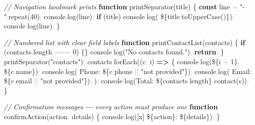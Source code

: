 \documentclass[
  justified,
  openright,
]{tufte-book}
\newcommand{\KeywordTok}[1]{\textcolor{CodeKeyword}{\textbf{#1}}}  %
\newcommand{\StringTok}[1]{\textcolor{CodeString}{#1}}              %
\newcommand{\CommentTok}[1]{\textcolor{CodeComment}{\textit{#1}}}  %
\newcommand{\CodeNumTok}[1]{\textcolor{CodeNumber}{#1}}             %
\newcommand{\CodeFuncTok}[1]{\textcolor{CodeKeyword}{#1}}           %
\newcommand{\CodeTypeTok}[1]{\textcolor{CodeType}{#1}}              %
\newcommand{\OperatorTok}[1]{\textcolor{DarkGray}{#1}}              %
\newenvironment{Shaded}{%
  \begin{mdframed}[style=TufteCode]%
}{%
  \end{mdframed}%
}
\begin{document}
\begin{Shaded}
\begin{Highlighting}[]
\CommentTok{// Navigation landmark prints}
\KeywordTok{function} \CodeFuncTok{printSeparator}(title) \{
  \KeywordTok{const} line \OperatorTok{=} \StringTok{"{-}"}\OperatorTok{.}\CodeFuncTok{repeat}(\CodeNumTok{40})\OperatorTok{;}
  console\OperatorTok{.}\CodeFuncTok{log}(line)\OperatorTok{;}
  \KeywordTok{if} (title) console\OperatorTok{.}\CodeFuncTok{log}(\StringTok{\textasciigrave{}  }\StringTok{\$\{}title\OperatorTok{.}\CodeFuncTok{toUpperCase}()\StringTok{\}}\StringTok{\textasciigrave{}})\OperatorTok{;}
  console\OperatorTok{.}\CodeFuncTok{log}(line)\OperatorTok{;}
\}
 
\CommentTok{// Numbered list with clear field labels}
\KeywordTok{function} \CodeFuncTok{printContactList}(contacts) \{
  \KeywordTok{if} (contacts\OperatorTok{.}\CodeTypeTok{length} \OperatorTok{===} \CodeNumTok{0}) \{\}
    console\OperatorTok{.}\CodeFuncTok{log}(\StringTok{"No contacts found."})\OperatorTok{;}
    \KeywordTok{return}\OperatorTok{;}
  \}
  \CodeFuncTok{printSeparator}(\StringTok{"contacts"})\OperatorTok{;}
  contacts\OperatorTok{.}\CodeFuncTok{forEach}((c\OperatorTok{,} i) \KeywordTok{=\textgreater{}} \{
    console\OperatorTok{.}\CodeFuncTok{log}(\StringTok{\textasciigrave{}}\StringTok{\$\{}i \OperatorTok{+} \CodeNumTok{1}\StringTok{\}}\StringTok{. }\StringTok{\$\{}c\OperatorTok{.}\CodeTypeTok{name}\StringTok{\}}\StringTok{\textasciigrave{}})\OperatorTok{;}
    console\OperatorTok{.}\CodeFuncTok{log}(\StringTok{\textasciigrave{}   Phone: }\StringTok{\$\{}c\OperatorTok{.}\CodeTypeTok{phone} \OperatorTok{||} \StringTok{"not provided"}\StringTok{\}}\StringTok{\textasciigrave{}})\OperatorTok{;}
    console\OperatorTok{.}\CodeFuncTok{log}(\StringTok{\textasciigrave{}   Email: }\StringTok{\$\{}c\OperatorTok{.}\CodeTypeTok{email} \OperatorTok{||} \StringTok{"not provided"}\StringTok{\}}\StringTok{\textasciigrave{}})\OperatorTok{;}
  )\OperatorTok{;}
  console\OperatorTok{.}\CodeFuncTok{log}(\StringTok{\textasciigrave{}Total: }\StringTok{\$\{}contacts\OperatorTok{.}\CodeTypeTok{length}\StringTok{\}}\StringTok{ contact(s)\textasciigrave{}})\OperatorTok{;}
\}
 
\CommentTok{// Confirmation messages {-}{-}{-} every action must produce one}
\KeywordTok{function} \CodeFuncTok{confirmAction}(action\OperatorTok{,} details) \{
  console\OperatorTok{.}\CodeFuncTok{log}(\StringTok{\textasciigrave{}[x] }\StringTok{\$\{}action\StringTok{\}}\StringTok{: }\StringTok{\$\{}details\StringTok{\}}\StringTok{\textasciigrave{}})\OperatorTok{;}
\}
\end{Highlighting}
\end{Shaded}
\end{document}
